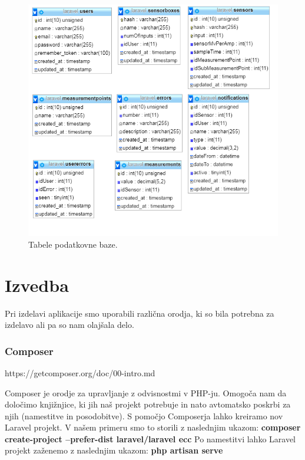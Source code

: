 \documentclass[12pt,a4paper,titlepage,openany]{report}
\begin{document}
\begin{figure}[H]
\begin{center}
\includegraphics[width=1\linewidth]{Slike/DbTabele.png}
\end{center}
\caption{Tabele podatkovne baze.}\label{slika:DbTabele}
\end{figure}

\chapter{Izvedba}
\thispagestyle{fancy}
Pri izdelavi aplikacije smo uporabili različna orodja, ki so bila potrebna za izdelavo ali pa so nam olajšala delo.

\subsection{Composer}

https://getcomposer.org/doc/00-intro.md

Composer je orodje za upravljanje z odvisnostmi v PHP-ju. Omogoča nam da določimo knjižnjice, ki jih naš projekt potrebuje in nato avtomatsko poskrbi za njih (namestitve in posodobitve).
S pomočjo Composerja lahko kreiramo nov Laravel projekt. V našem primeru smo to storili z naslednjim ukazom:
\newline
\newline
\textbf{composer create-project --prefer-dist laravel/laravel ecc}
\newline
\newline
Po namestitvi lahko Laravel projekt zaženemo z naslednjim ukazom:
\newline
\newline
\textbf{php artisan serve}
\end{document}

